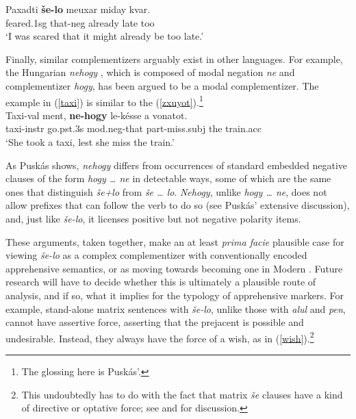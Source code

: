 \documentclass[output=paper,colorlinks,citecolor=brown]{langscibook}
\begin{document}
\ea
\label{selo-kvar}
\gll Paxadti \textbf{še-lo} meuxar miday kvar. \\
feared.{\sc 1sg} that-{\sc neg} already late too \\
\glt `I was scared that it might already be too late.'
\z


Finally, similar complementizers arguably exist in other languages. For example, the Hungarian \textit{nehogy} \citep{szabolcsi02, puskas17}, which is composed of modal negation \textit{ne} and complementizer \textit{hogy}, has been argued to be a modal complementizer. The example in (\ref{taxi}) is similar to the  (\ref{zxuyot}).\footnote{The glossing here is Pusk\'{a}s'.} 
\ea
\label{taxi}   \\
\gll  Taxi-val ment, \textbf{ne-hogy}  le-k\'{e}sse a vonatot. \\
taxi-{\sc instr} go.{\sc pst.3s} {\sc mod}.{\sc neg}-that {\sc part}-miss.{\sc subj} the train.{\sc acc}  \\

\glt `She took a taxi, lest she miss the train.'
\z

As Pusk\'{a}s shows, \textit{nehogy} differs from occurrences of standard embedded negative clauses of the form \textit{hogy {\ldots} ne} in detectable ways, some of which are the same ones that distinguish \textit{še+lo} from \textit{še {\ldots} lo}. \textit{Nehogy}, unlike \textit{hogy {\ldots} ne}, does not allow prefixes that can follow the verb to do so (see Pusk\'{a}s' extensive discussion), and, just like \textit{še-lo}, it licenses positive but not negative polarity items.

These arguments, taken together, make an at least \textit{prima facie} plausible case for viewing \textit{še-lo} as a complex complementizer with conventionally encoded apprehensive semantics, or as moving towards becoming one in Modern . Future research will have to decide whether this is ultimately a plausible route of analysis, and if so, what it implies for the typology of apprehensive markers. For example, stand-alone matrix sentences with \textit{še-lo}, unlike those with \textit{alul} and \textit{pen}, cannot have assertive force, asserting that the prejacent is possible and undesirable. Instead, they always have the force of a wish, as in (\ref{wish}).\footnote{This undoubtedly has to do with the fact that matrix \textit{še} clauses have a kind of directive or optative force; see \citet{schwarzwald-shlomo} and \citet{francez-JJL} for discussion.}
\end{document}
